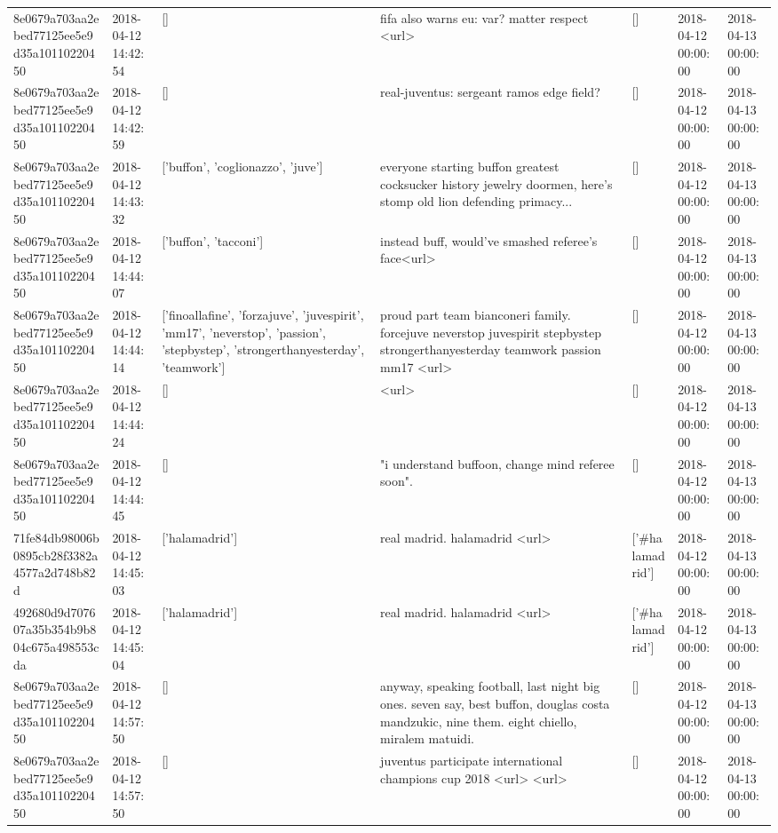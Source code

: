 \begin{tabular}{lllllll}
8e0679a703aa2ebed77125ee5e9d35a10110220450 & 2018-04-12 14:42:54 & [] & fifa also warns eu: var? matter respect <url> & [] & 2018-04-12 00:00:00 & 2018-04-13 00:00:00 \\
8e0679a703aa2ebed77125ee5e9d35a10110220450 & 2018-04-12 14:42:59 & [] & real-juventus: sergeant ramos edge field? & [] & 2018-04-12 00:00:00 & 2018-04-13 00:00:00 \\
8e0679a703aa2ebed77125ee5e9d35a10110220450 & 2018-04-12 14:43:32 & ['buffon', 'coglionazzo', 'juve'] & everyone starting buffon greatest cocksucker history jewelry doormen, here's stomp old lion defending primacy... & [] & 2018-04-12 00:00:00 & 2018-04-13 00:00:00 \\
8e0679a703aa2ebed77125ee5e9d35a10110220450 & 2018-04-12 14:44:07 & ['buffon', 'tacconi'] & instead buff, would've smashed referee's face<url> & [] & 2018-04-12 00:00:00 & 2018-04-13 00:00:00 \\
8e0679a703aa2ebed77125ee5e9d35a10110220450 & 2018-04-12 14:44:14 & ['finoallafine', 'forzajuve', 'juvespirit', 'mm17', 'neverstop', 'passion', 'stepbystep', 'strongerthanyesterday', 'teamwork'] & proud part team bianconeri family. forcejuve neverstop juvespirit stepbystep strongerthanyesterday teamwork passion mm17 <url> & [] & 2018-04-12 00:00:00 & 2018-04-13 00:00:00 \\
8e0679a703aa2ebed77125ee5e9d35a10110220450 & 2018-04-12 14:44:24 & [] & <url> & [] & 2018-04-12 00:00:00 & 2018-04-13 00:00:00 \\
8e0679a703aa2ebed77125ee5e9d35a10110220450 & 2018-04-12 14:44:45 & [] & "i understand buffoon, change mind referee soon". & [] & 2018-04-12 00:00:00 & 2018-04-13 00:00:00 \\
71fe84db98006b0895cb28f3382a4577a2d748b82d & 2018-04-12 14:45:03 & ['halamadrid'] & real madrid. halamadrid <url> & ['#halamadrid'] & 2018-04-12 00:00:00 & 2018-04-13 00:00:00 \\
492680d9d707607a35b354b9b804c675a498553cda & 2018-04-12 14:45:04 & ['halamadrid'] & real madrid. halamadrid <url> & ['#halamadrid'] & 2018-04-12 00:00:00 & 2018-04-13 00:00:00 \\
8e0679a703aa2ebed77125ee5e9d35a10110220450 & 2018-04-12 14:57:50 & [] & anyway, speaking football, last night big ones. seven say, best buffon, douglas costa mandzukic, nine them. eight chiello, miralem matuidi. & [] & 2018-04-12 00:00:00 & 2018-04-13 00:00:00 \\
8e0679a703aa2ebed77125ee5e9d35a10110220450 & 2018-04-12 14:57:50 & [] & juventus participate international champions cup 2018 <url> <url> & [] & 2018-04-12 00:00:00 & 2018-04-13 00:00:00 \\

\end{tabular}
